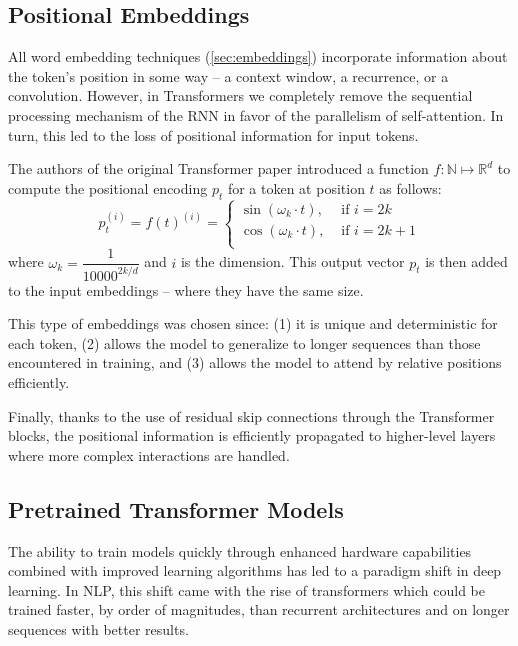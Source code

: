 \subsection{Positional Embeddings}
\label{sec:pos_embeddings}

All word embedding techniques (\cref{sec:embeddings}) incorporate information about the token's position in some way -- a context window, a recurrence, or a convolution. However, in Transformers we completely remove the sequential processing mechanism of the RNN in favor of the parallelism of self-attention. In turn, this led to the loss of positional information for input tokens.

The authors of the original Transformer paper \citep{vaswani2017attention} introduced a function $f \colon \mathbb{N} \mapsto \mathbb{R}^d$ to compute the positional encoding $p_t$ for a token at position $t$ as follows:
\[
p_t^{(i)} = f(t) ^ {(i)} = \begin{cases}
	\sin(\omega_k \cdot t), & \text{ if } i = 2k \\
	\cos(\omega_k \cdot t), & \text{ if } i = 2k + 1\\
\end{cases}
\]
where $\omega_k = \dfrac{1}{10000^{2k/d}}$ and $i$ is the dimension. This output vector $p_t$ is then added to the input embeddings -- where they have the same size.

This type of embeddings was chosen since: (1) it is unique and deterministic for each token, (2) allows the model to generalize to longer sequences than those encountered in training, and (3) allows the model to attend by relative positions efficiently.

Finally, thanks to the use of residual skip connections through the Transformer blocks, the positional information is efficiently propagated to higher-level layers where more complex interactions are handled.


\subsection{Pretrained Transformer Models}
\label{sec:pretrained_models}

The ability to train models quickly through enhanced hardware capabilities combined with improved learning algorithms has led to a paradigm shift in deep learning. In NLP, this shift came with the rise of transformers which could be trained faster, by order of magnitudes, than recurrent architectures and on longer sequences with better results.

